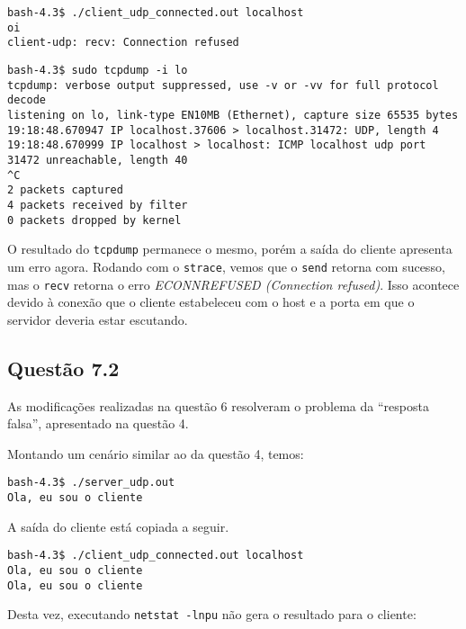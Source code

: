 \documentclass[a4paper,10pt]{article}
\begin{document}
\begin{lstlisting}
bash-4.3$ ./client_udp_connected.out localhost
oi
client-udp: recv: Connection refused

\end{lstlisting}

\begin{lstlisting}
bash-4.3$ sudo tcpdump -i lo
tcpdump: verbose output suppressed, use -v or -vv for full protocol decode
listening on lo, link-type EN10MB (Ethernet), capture size 65535 bytes
19:18:48.670947 IP localhost.37606 > localhost.31472: UDP, length 4
19:18:48.670999 IP localhost > localhost: ICMP localhost udp port 31472 unreachable, length 40
^C
2 packets captured
4 packets received by filter
0 packets dropped by kernel

\end{lstlisting}

O resultado do {\tt tcpdump} permanece o mesmo, porém a saída do cliente apresenta um erro agora. Rodando com o {\tt strace}, vemos que o {\tt send} retorna com sucesso, mas o {\tt recv} retorna o erro \textit{ECONNREFUSED (Connection refused)}. Isso acontece devido à conexão que o cliente estabeleceu com o host e a porta em que o servidor deveria estar escutando.

\subsection{Questão 7.2}
As modificações realizadas na questão 6 resolveram o problema da ``resposta falsa'', apresentado na questão 4.

Montando um cenário similar ao da questão 4, temos:

\begin{lstlisting}
bash-4.3$ ./server_udp.out
Ola, eu sou o cliente

\end{lstlisting}

A saída do cliente está copiada a seguir.

\begin{lstlisting}
bash-4.3$ ./client_udp_connected.out localhost
Ola, eu sou o cliente
Ola, eu sou o cliente

\end{lstlisting}

Desta vez, executando {\tt netstat -lnpu} não gera o resultado para o cliente:
\end{document}
